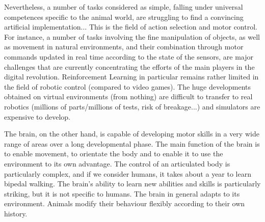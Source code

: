 \documentclass[runningheads]{llncs}
\begin{document}
Nevertheless, a number of tasks considered as simple, falling under universal competences specific to the animal world, are struggling to find a convincing artificial implementation... This is the field of action selection and motor control. For instance, a number of tasks involving the fine manipulation of objects, as well as movement in natural environments, and their combination through motor commands updated in real time according to the state of the sensors, are major challenges that are currently concentrating the efforts of the main players in the digital revolution.
Reinforcement Learning in particular remains rather limited in the field of robotic control (compared to video games). The huge developments obtained on virtual environments (from nothing) are difficult to transfer to real robotics (millions of parts/millions of tests, risk of breakage...) and simulators are expensive to develop.

The brain, on the other hand, is capable of developing motor skills in a very wide range of areas over a long developmental phase.   
The main function of the brain is to enable movement, to orientate the body and to enable it to use the environment to its own advantage. The control of an articulated body is particularly complex, and if we consider humans, it takes about a year to learn bipedal walking. The brain's ability to learn new abilities and skills is particularly striking, but it is not specific to humans. The brain in general adapts to its environment. Animals modify their behaviour flexibly according to their own history. 


\end{document}
